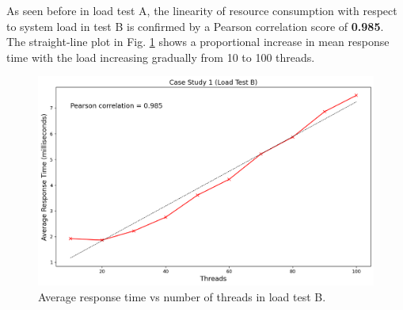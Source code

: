 As seen before in load test A, the linearity of resource consumption with respect to system load in test B is confirmed by a Pearson correlation score of \textbf{0.985}. The straight-line plot in Fig. \ref{fig:cs01-ltb-4} shows a proportional increase in mean response time with the load increasing gradually from 10 to 100 threads.

\begin{figure}[H]
  \centering
  \includegraphics[width=0.8\linewidth]{./assets/images/case-study-01/cs01-ltb-4.png}
  \caption{Average response time vs number of threads in load test B.}
  \label{fig:cs01-ltb-4}
\end{figure}